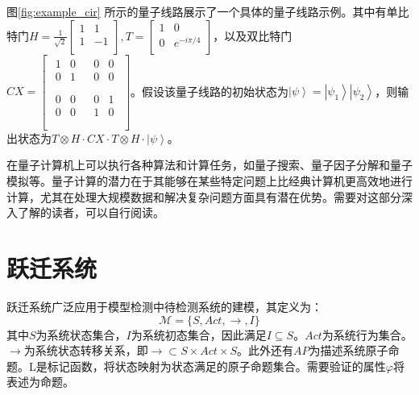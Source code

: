 图\ref{fig:example_cir} 所示的量子线路展示了一个具体的量子线路示例。其中有单比特门\(H=\frac{1}{\sqrt2}\left[\begin{matrix}1&1\\1&-1\\\end{matrix}\right],T=\left[\begin{matrix}1&0\\0&e^{-i\pi/4}\\\end{matrix}\right]\)，以及双比特门\(CX=\left[\begin{matrix}\begin{matrix}1&0\\0&1\\\end{matrix}&\begin{matrix}0&0\\0&0\\\end{matrix}\\\begin{matrix}0&0\\0&0\\\end{matrix}&\begin{matrix}0&1\\1&0\\\end{matrix}\\\end{matrix}\right]\)。假设该量子线路的初始状态为\(\left|\psi\right\rangle=\left|\psi_1\right\rangle\left|\psi_2\right\rangle\)，则输出状态为\(T\otimes H\cdot CX\cdot T\otimes H\cdot\left|\psi\right\rangle\)。

在量子计算机上可以执行各种算法和计算任务，如量子搜索\citep{Grover_1996}、量子因子分解\citep{shor}和量子模拟\citep{Feynman}等。量子计算的潜力在于其能够在某些特定问题上比经典计算机更高效地进行计算，尤其在处理大规模数据和解决复杂问题方面具有潜在优势。需要对这部分深入了解的读者，可以自行阅读\citep{nielsen2010quantum}。

\section{跃迁系统}
跃迁系统广泛应用于模型检测中待检测系统的建模，其定义为\citep{baier2008principles}：
\begin{equation}
\mathcal{M}=\{S,Act,\rightarrow,I\}
\end{equation}
其中\(S\)为系统状态集合，\(I\)为系统初态集合，因此满足\(I\subseteq S\)。\(Act\)为系统行为集合。\(\rightarrow\)为系统状态转移关系，即\(\rightarrow\subset S\times Act\times S\)。此外还有\(AP\)为描述系统原子命题。L是标记函数，将状态映射为状态满足的原子命题集合。需要验证的属性\(\varphi\)将表述为命题。


